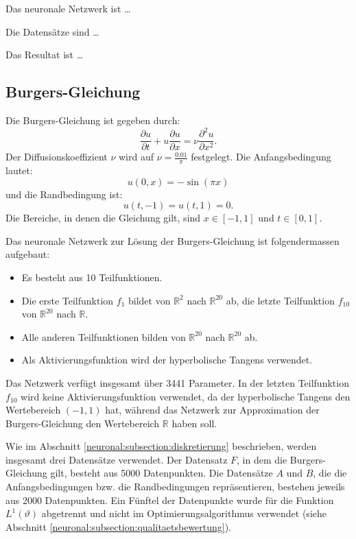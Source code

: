  Das neuronale Netzwerk ist \ldots

 Die Datensätze sind \ldots

 Das Resultat ist \ldots

\subsection{Burgers-Gleichung}\label{neuronal:subsection:burgers_gleichung}
Die Burgers-Gleichung ist gegeben durch:
\begin{equation}
    \frac{\partial u}{\partial t} + u \frac{\partial u}{\partial x} = \nu \frac{\partial^2 u}{\partial x^2}.
    \label{neuronal:burgers}
\end{equation}
Der Diffusionskoeffizient \( \nu \) wird auf \( \nu = \frac{0.01}{\pi} \) festgelegt.
Die Anfangsbedingung lautet:
\begin{equation}
    u(0, x) = - \sin(\pi x)
    \label{neuronal:burgers_anfang}
\end{equation}
und die Randbedingung ist:
\begin{equation}
    u(t, -1) = u(t, 1) = 0.
    \label{neuronal:burgers_rand}
\end{equation}
Die Bereiche, in denen die Gleichung gilt, sind \( x \in [-1,1] \) und \( t \in [0,1] \).

Das neuronale Netzwerk zur Lösung der Burgers-Gleichung ist folgendermassen aufgebaut:
\begin{itemize}
    \item Es besteht aus 10 Teilfunktionen.
    \item Die erste Teilfunktion \( f_1 \) bildet von \( \mathbb{R}^2 \) nach \( \mathbb{R}^{20} \) ab, die letzte Teilfunktion \( f_{10} \) von \( \mathbb{R}^{20} \) nach \( \mathbb{R} \).
    \item Alle anderen Teilfunktionen bilden von \( \mathbb{R}^{20} \) nach \( \mathbb{R}^{20} \) ab.
    \item Als Aktivierungsfunktion wird der hyperbolische Tangens verwendet.
\end{itemize}
Das Netzwerk verfügt insgesamt über 3441 Parameter.
In der letzten Teilfunktion \( f_{10} \) wird keine Aktivierungsfunktion verwendet, da der hyperbolische Tangens den Wertebereich \((-1, 1)\) hat, während das Netzwerk zur Approximation der Burgers-Gleichung den Wertebereich \( \mathbb{R} \) haben soll.

Wie im Abschnitt \ref{neuronal:subsection:diskretierung} beschrieben, werden insgesamt drei Datensätze verwendet.
Der Datensatz \( F \), in dem die Burgers-Gleichung gilt, besteht aus 5000 Datenpunkten.
Die Datensätze \( A \) und \( B \), die die Anfangsbedingungen bzw. die Randbedingungen repräsentieren, bestehen jeweils aus 2000 Datenpunkten.
Ein Fünftel der Datenpunkte wurde für die Funktion \( L^1(\vartheta) \) abgetrennt und nicht im Optimierungsalgorithmus verwendet (siehe Abschnitt \ref{neuronal:subsection:qualitaetsbewertung}).

